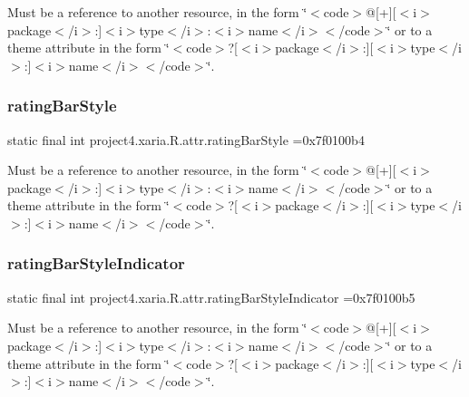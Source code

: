 Must be a reference to another resource, in the form \char`\"{}$<$code$>$@\mbox{[}+\mbox{]}\mbox{[}$<$i$>$package$<$/i$>$\+:\mbox{]}$<$i$>$type$<$/i$>$\+:$<$i$>$name$<$/i$>$$<$/code$>$\char`\"{} or to a theme attribute in the form \char`\"{}$<$code$>$?\mbox{[}$<$i$>$package$<$/i$>$\+:\mbox{]}\mbox{[}$<$i$>$type$<$/i$>$\+:\mbox{]}$<$i$>$name$<$/i$>$$<$/code$>$\char`\"{}. \mbox{\label{classproject4_1_1xaria_1_1R_1_1attr_a33c3ad766e4d2d67648a41649dade84b}} 
\subsubsection{\texorpdfstring{rating\+Bar\+Style}{ratingBarStyle}}
{\footnotesize\ttfamily static final int project4.\+xaria.\+R.\+attr.\+rating\+Bar\+Style =0x7f0100b4\hspace{0.3cm}{\ttfamily [static]}}

Must be a reference to another resource, in the form \char`\"{}$<$code$>$@\mbox{[}+\mbox{]}\mbox{[}$<$i$>$package$<$/i$>$\+:\mbox{]}$<$i$>$type$<$/i$>$\+:$<$i$>$name$<$/i$>$$<$/code$>$\char`\"{} or to a theme attribute in the form \char`\"{}$<$code$>$?\mbox{[}$<$i$>$package$<$/i$>$\+:\mbox{]}\mbox{[}$<$i$>$type$<$/i$>$\+:\mbox{]}$<$i$>$name$<$/i$>$$<$/code$>$\char`\"{}. \mbox{\label{classproject4_1_1xaria_1_1R_1_1attr_a887a061d845cdddf038ac47680cc0717}} 
\subsubsection{\texorpdfstring{rating\+Bar\+Style\+Indicator}{ratingBarStyleIndicator}}
{\footnotesize\ttfamily static final int project4.\+xaria.\+R.\+attr.\+rating\+Bar\+Style\+Indicator =0x7f0100b5\hspace{0.3cm}{\ttfamily [static]}}

Must be a reference to another resource, in the form \char`\"{}$<$code$>$@\mbox{[}+\mbox{]}\mbox{[}$<$i$>$package$<$/i$>$\+:\mbox{]}$<$i$>$type$<$/i$>$\+:$<$i$>$name$<$/i$>$$<$/code$>$\char`\"{} or to a theme attribute in the form \char`\"{}$<$code$>$?\mbox{[}$<$i$>$package$<$/i$>$\+:\mbox{]}\mbox{[}$<$i$>$type$<$/i$>$\+:\mbox{]}$<$i$>$name$<$/i$>$$<$/code$>$\char`\"{}. \mbox{\label{classproject4_1_1xaria_1_1R_1_1attr_a3168177e8711f1f1fbcfd6c1782f6af7}} 
